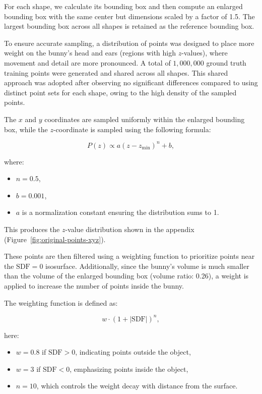\documentclass[a4paper,12pt]{article}
\begin{document}
For each shape, we calculate its bounding box and then compute an enlarged bounding box with the same center but dimensions scaled by a factor of 1.5. The largest bounding box across all shapes is retained as the reference bounding box.

To ensure accurate sampling, a distribution of points was designed to place more weight on the bunny's head and ears (regions with high \( z \)-values), where movement and detail are more pronounced. A total of \( 1,000,000 \) ground truth training points were generated and shared across all shapes. This shared approach was adopted after observing no significant differences compared to using distinct point sets for each shape, owing to the high density of the sampled points.

The \( x \) and \( y \) coordinates are sampled uniformly within the enlarged bounding box, while the \( z \)-coordinate is sampled using the following formula:

\[
	P(z) \propto a(z - z_{\text{min}})^n + b,
\]

where:
\begin{itemize}
	\item \( n = 0.5 \),
	\item \( b = 0.001 \),
	\item \( a \) is a normalization constant ensuring the distribution sums to 1.
\end{itemize}

This produces the \( z \)-value distribution shown in the appendix (Figure~\ref{fig:original-points-xyz}).

These points are then filtered using a weighting function to prioritize points near the \( \text{SDF} = 0 \) isosurface. Additionally, since the bunny's volume is much smaller than the volume of the enlarged bounding box (volume ratio: 0.26), a weight is applied to increase the number of points inside the bunny.

The weighting function is defined as:

\[
	w \cdot (1 + |\text{SDF}|)^n,
\]

here:
\begin{itemize}
	\item \( w = 0.8 \) if \( \text{SDF} > 0 \), indicating points outside the object,
	\item \( w = 3 \) if \( \text{SDF} < 0 \), emphasizing points inside the object,
	\item \( n = 10 \), which controls the weight decay with distance from the surface.
\end{itemize}
\end{document}
